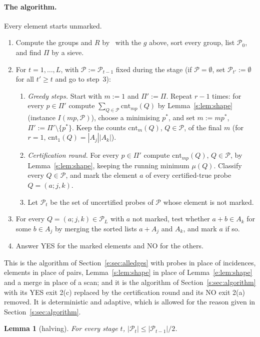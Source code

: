 \documentclass[11pt]{article}
\newtheorem{lemma}[theorem]{Lemma}
\theoremstyle{definition}
\theoremstyle{remark}
\newcommand{\cnt}{\mathrm{cnt}}
\newcommand{\Pq}{\mathcal{P}}
\begin{document}
\paragraph{The algorithm.} Every element starts unmarked.
\begin{enumerate}[label=\arabic*.,nosep]
\item Compute the groups and $R$ by~\cite[Lemma~3.3]{FKP24} with the $g$ above, sort every group, list $\Pq_0$, and find $\Pi$ by a sieve.
\item For $t=1,\dots,L$, with $\Pq:=\Pq_{t-1}$ fixed during the stage (if $\Pq=\emptyset$, set $\Pq_{t'}:=\emptyset$ for all $t'\ge t$ and go to step~3):
\begin{enumerate}[label=(\alph*),nosep]
\item \emph{Greedy steps.} Start with $m:=1$ and $\Pi':=\Pi$. Repeat $r-1$ times: for every $p\in\Pi'$ compute $\sum_{Q\in\Pq}\cnt_{mp}(Q)$ by Lemma~\ref{s:lem:shape} (instance $I(mp,\Pq)$), choose a minimising $p^*$, and set $m:=mp^*$, $\Pi':=\Pi'\setminus\{p^*\}$. Keep the counts $\cnt_m(Q)$, $Q\in\Pq$, of the final $m$ (for $r=1$, $\cnt_1(Q)=|A_j||A_k|$).
\item \emph{Certification round.} For every $p\in\Pi'$ compute $\cnt_{mp}(Q)$, $Q\in\Pq$, by Lemma~\ref{s:lem:shape}, keeping the running minimum $\mu(Q)$. Classify every $Q\in\Pq$, and mark the element $a$ of every certified-true probe $Q=(a;j,k)$.
\item Let $\Pq_t$ be the set of uncertified probes of $\Pq$ whose element is not marked.
\end{enumerate}
\item For every $Q=(a;j,k)\in\Pq_L$ with $a$ not marked, test whether $a+b\in A_k$ for some $b\in A_j$ by merging the sorted lists $a+A_j$ and $A_k$, and mark $a$ if so.
\item Answer YES for the marked elements and NO for the others.
\end{enumerate}
This is the algorithm of Section~\ref{e:sec:alledges} with probes in place of incidences, elements in place of pairs, Lemma~\ref{s:lem:shape} in place of Lemma~\ref{e:lem:shape} and a merge in place of a scan; and it is the algorithm of Section~\ref{s:sec:algorithm} with its YES exit 2(c) replaced by the certification round and its NO exit 2(a) removed. It is deterministic and adaptive, which is allowed for the reason given in Section~\ref{s:sec:algorithm}.

\begin{lemma}[halving]\label{b:lem:halvA}
For every stage $t$, $|\Pq_t|\le|\Pq_{t-1}|/2$.
\end{lemma}
\end{document}
